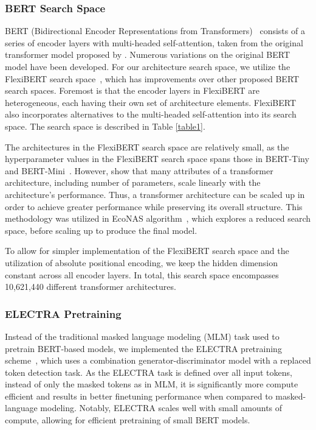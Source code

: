 \documentclass[11pt]{article}
\begin{document}
\subsubsection{BERT Search Space}
    BERT (Bidirectional Encoder Representations from Transformers)~\cite{devlin_bert_2019} consists of a series of encoder layers with multi-headed self-attention, taken from the original transformer model proposed by \citet{vaswani_attention_2017}. Numerous variations on the original BERT model have been developed. For our architecture search space, we utilize the FlexiBERT search space~\cite{tuli_flexibert_2022}, which has improvements over other proposed BERT search spaces. Foremost is that the encoder layers in FlexiBERT are heterogeneous, each having their own set of architecture elements. FlexiBERT also incorporates alternatives to the multi-headed self-attention into its search space. The search space is described in Table \ref{table1}. 
    
    The architectures in the FlexiBERT search space are relatively small, as the hyperparameter values in the FlexiBERT search space spans those in BERT-Tiny and BERT-Mini~\cite{turc_well-read_2019}. However, \citet{kaplan_scaling_2020} show that many attributes of a transformer architecture, including number of parameters, scale linearly with the architecture's performance. Thus, a transformer architecture can be scaled up in order to achieve greater performance while preserving its overall structure. This methodology was utilized in EcoNAS algorithm~\cite{zhou_econas_2020}, which explores a reduced search space, before scaling up to produce the final model.
    
    To allow for simpler implementation of the FlexiBERT search space and the utilization of absolute positional encoding, we keep the hidden dimension constant across all encoder layers. In total, this search space encompasses 10,621,440 different transformer architectures.

\subsubsection{ELECTRA Pretraining}
    Instead of the traditional masked language modeling (MLM) task used to pretrain BERT-based models, we implemented the ELECTRA pretraining scheme~\cite{clark_electra_2020}, which uses a combination generator-discriminator model with a replaced token detection task. As the \mbox{ELECTRA} task is defined over all input tokens, instead of only the masked tokens as in MLM, it is significantly more compute efficient and results in better finetuning performance when compared to masked-language modeling. Notably, ELECTRA scales well with small amounts of compute, allowing for efficient pretraining of small BERT models.
\end{document}
